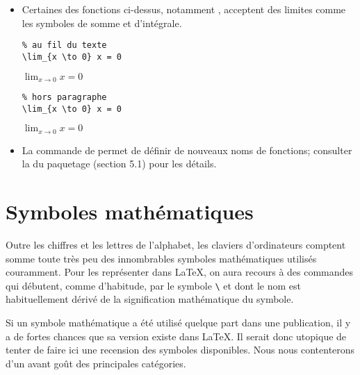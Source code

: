 \begin{itemize}
\begin{demo}
\begin{minipage}{0.45\linewidth}
\begin{texample}
\begin{lstlisting}
$3 \log 2$
\end{lstlisting}
        \producing
        $3 \log 2$
      \end{texample}
    \end{minipage}
  \end{demo}
\item Certaines des fonctions ci-dessus, notamment \cmd{\lim}, acceptent
  des limites comme les symboles de somme et d'intégrale.
  \begin{demo}
    \begin{texample}
\begin{lstlisting}
% au fil du texte
\lim_{x \to 0} x = 0
\end{lstlisting}
      \producing
      $\lim_{x \to 0} x = 0$
    \end{texample}

    \begin{texample}
\begin{lstlisting}
% hors paragraphe
\lim_{x \to 0} x = 0
\end{lstlisting}
      \producing
      $\displaystyle \lim_{x \to 0} x = 0$
    \end{texample}
  \end{demo}
\item La commande \cmd{\DeclareMathOperator} de  permet
  de définir de nouveaux noms de fonctions; consulter la %
  du paquetage (section 5.1) pour les détails.
\end{itemize}



\section{Symboles mathématiques}
\label{sec:math:symboles}

Outre les chiffres et les lettres de l'alphabet, les claviers
d'ordinateurs comptent somme toute très peu des innombrables symboles
mathématiques utilisés couramment. Pour les représenter dans {\LaTeX},
on aura recours à des commandes qui débutent, comme d'habitude, par le
symbole \verb=\= et dont le nom est habituellement dérivé de la
signification mathématique du symbole.

Si un symbole mathématique a été utilisé quelque part dans une
publication, il y a de fortes chances que sa version existe dans
{\LaTeX}. Il serait donc utopique de tenter de faire ici une recension
des symboles disponibles. Nous nous contenterons d'un avant goût des
principales catégories.


